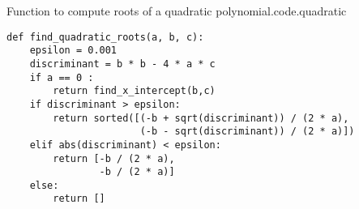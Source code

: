 \begin{listing}{Function to compute roots of a quadratic polynomial.}{code.quadratic}
\begin{minipage}[c]{0.95\textwidth}\begin{lstlisting}
def find_quadratic_roots(a, b, c):
    epsilon = 0.001
    discriminant = b * b - 4 * a * c
    if a == 0 :
        return find_x_intercept(b,c)
    if discriminant > epsilon:
        return sorted([(-b + sqrt(discriminant)) / (2 * a),
                       (-b - sqrt(discriminant)) / (2 * a)])
    elif abs(discriminant) < epsilon:
        return [-b / (2 * a), 
                -b / (2 * a)]
    else:
        return []
\end{lstlisting}\end{minipage}\end{listing}

